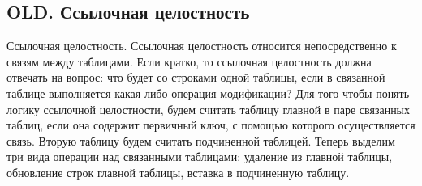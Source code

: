 \subsection{OLD. Ссылочная целостность}

Ссылочная целостность. Ссылочная целостность относится непосредственно к связям между таблицами. Если кратко, то ссылочная целостность должна отвечать на вопрос: что будет со строками одной таблицы, если в связанной таблице выполняется какая-либо операция модификации? Для того чтобы понять логику ссылочной целостности, будем считать таблицу главной в паре связанных таблиц, если она содержит первичный ключ, с помощью которого осуществляется связь. Вторую таблицу будем считать подчиненной таблицей. Теперь выделим три вида операции над связанными таблицами: удаление из главной таблицы, обновление строк главной таблицы, вставка в подчиненную таблицу.

